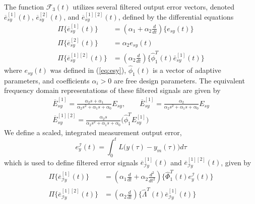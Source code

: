 The function $\mathcal{F}_3(t)$ utilizes several filtered output error vectors, denoted $\overline{e}_{sy}^{[1]}(t)$, $\overline{e}_{sy}^{[2]}(t)$, and $\overline{e}_{sy}^{[1][2]}(t)$, defined by the differential equations
\begin{equation}
\begin{aligned} 
	\Pi \big \{ \overline{e}_{sy}^{[1]}(t) \big \} & = (\alpha_1 + \alpha_2 \frac{d}{dt}) \big \{ e_{sy}(t) \big \} \\
	\Pi \big \{ \overline{e}_{sy}^{[2]}(t) \big \} & = \alpha_2 e_{sy}(t) \\
	\Pi \big \{ \overline{e}_{sy}^{[1][2]}(t) \big \} & = (\alpha_2 \frac{d}{dt}) \big \{ \hat{\phi}_1^T(t) \bar{e}_{sy}^{[1]}(t) \big \}
\end{aligned} \label{eq:esy_rd3}
\end{equation}
where $e_{sy}(t)$ was defined in (\ref{eq:esy}), $\hat{\phi}_1(t)$ is a vector of adaptive parameters, and coefficients $\alpha_i > 0$ are free design parameters. The equivalent frequency domain representations of these filtered signals are given by
\begin{equation}
\begin{gathered}
	\overline{E}_{sy}^{[1]} = \frac{\alpha_2 s + \alpha_1}{\alpha_2 s^2 + \alpha_1 s + \alpha_0} E_{sy}, \qquad \overline{E}_{sy}^{[1]} = \frac{\alpha_2}{\alpha_2 s^2 + \alpha_1 s + \alpha_0} E_{sy} \\
	\overline{E}_{sy}^{[1][2]} = \frac{\alpha_2 s}{\alpha_2 s^2 + \alpha_1 s + \alpha_0} \big( \hat{\phi}_1^T E_{sy}^{[1]} \big)
	\end{gathered}
\end{equation}
We define a scaled, integrated measurement output error, 
\begin{equation}
e_{y}^{\mathcal{I}}(t) = \int_0^{t} L\big (y(\tau) - y_m(\tau)\big) d\tau
\end{equation}
which is used to define filtered error signals $\overline{e}_{\mathcal{I}y}^{[1]} (t)$ and $\overline{e}_{\mathcal{I}y}^{[1][2]} (t)$, given by
\begin{equation}
\begin{aligned}
	\Pi \big \{  \overline{e}_{\mathcal{I}y}^{[1]} (t) \big \} &= (\alpha_1 \frac{d}{dt} + \alpha_2 \frac{d^2}{dt^2}) \big \{ \hat{\Phi}_1^T (t) e_{y}^{\mathcal{I}}(t) \big \} \\
	\Pi \big \{  \overline{e}_{\mathcal{I}y}^{[1][2]} (t) \big \} &= (\alpha_2 \frac{d}{dt}) \big \{ \hat{\Lambda}^T(t) \overline{e}_{\mathcal{I}y}^{[1]} (t) \big \}
\end{aligned} \label{eq:eIy_rd3}
\end{equation}
